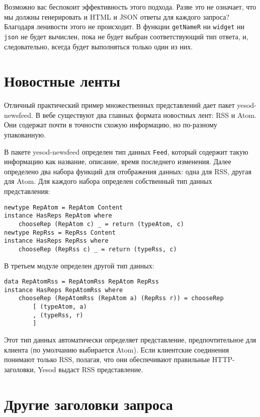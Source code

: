 Возможно вас беспокоит эффективность этого подхода. Разве это не означает, что мы должны генерировать и HTML и JSON ответы для каждого запроса? Благодаря ленивости этого не происходит. В функции \lstinline'getNameR' ни \lstinline'widget' ни \lstinline'json' не будет вычислен, пока не будет выбран соответствующий тип ответа, и, следовательно, всегда будет выполняться только один из них.

\section{Новостные ленты}

Отличный практический пример множественных представлений дает пакет yesod-newsfeed. В вебе существуют два главных формата новостных лент: RSS и Atom. Они содержат почти в точности схожую информацию, но по-разному упакованную.

В пакете yesod-newsfeed определен тип данных \lstinline'Feed', который содержит такую информацию как название, описание, время последнего изменения. Далее определено два набора функций для отображения данных: одна для RSS, другая для Atom. Для каждого набора определен собственный тип данных представления:

\begin{lstlisting}
newtype RepAtom = RepAtom Content
instance HasReps RepAtom where
    chooseRep (RepAtom c) _ = return (typeAtom, c)
newtype RepRss = RepRss Content
instance HasReps RepRss where
    chooseRep (RepRss c) _ = return (typeRss, c)
\end{lstlisting}

В третьем модуле определен другой тип данных:

\begin{lstlisting}
data RepAtomRss = RepAtomRss RepAtom RepRss
instance HasReps RepAtomRss where
    chooseRep (RepAtomRss (RepAtom a) (RepRss r)) = chooseRep
        [ (typeAtom, a)
        , (typeRss, r)
        ]
\end{lstlisting}

Этот тип данных автоматически определяет представление, предпочтительное для клиента (по умолчанию выбирается Atom). Если клиентские соединения понимают только RSS, полагая, что они обеспечивают правильные HTTP-заголовки, Yesod выдаст RSS представление.

\section{Другие заголовки запроса}

